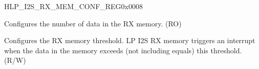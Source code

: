 \begin{register}{H}{LP\_I2S\_RX\_MEM\_CONF\_REG}{0x0008}\label{regdesc:LPI2SRXMEMCONFREG}
%
%
%
\regnewline%
\begin{regdesc}\begin{reglist}
\label{fielddesc:LPI2SRXMEMFIFOCNT}\item[LP\_I2S\_RX\_MEM\_FIFO\_CNT] Configures the number of data in the RX memory. (RO)
\label{fielddesc:LPI2SRXMEMTHRESHOLD}\item[LP\_I2S\_RX\_MEM\_THRESHOLD] Configures the RX memory threshold. LP I2S RX memory triggers an interrupt when the data in the memory exceeds (not including equals) this threshold. (R/W)
\end{reglist}\end{regdesc}
\end{register}


